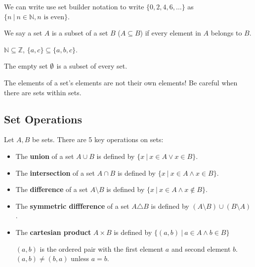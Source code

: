 \begin{notation}
	We can write use set builder notation to write \( \{0, 2, 4, 6, \ldots \}   \) as \( \{n ~|~ n \in \mathbb{N}, n \text{ is even}\} \).
\end{notation}

\begin{definition}
	We say a set \( A \) is a subset of a set \( B \) (\( A \subseteq B\)) if every element in \( A \) belongs to \( B \).
\end{definition}

\begin{eg}
	\( \mathbb{N} \subseteq \mathbb{Z} \), \( \{a, c\} \subseteq \{a, b, c\}    \).
\end{eg}

\begin{property}
	The empty set \( \emptyset \) is a subset of every set.
\end{property}

\begin{note}
	The elements of a set's elements are not their own elements! Be careful when there are sets within sets.
\end{note}

\subsection{Set Operations}
Let \( A,B \) be sets. There are 5 key operations on sets:
\begin{itemize}
	\item The \textbf{union} of a set \( A \cup B \) is defined by \( \{x ~|~ x \in A \lor x \in B\}   \).
	\item The \textbf{intersection} of a set \( A \cap B \) is defined by \( \{x ~|~ x \in A \land x \in B \}   \).
	\item The \textbf{difference} of a set \( A \setminus B \) is defined by \( \{x ~|~ x \in A \land x \not\in B \}   \).
	\item The \textbf{symmetric diffference} of a set \( A \triangle B \) is defined by \( (A \setminus B) \cup (B \setminus A) \).
	\item The \textbf{cartesian product} \( A \times B \) is defined by \( \{(a,b) ~|~ a \in A \land b \in B\}  \)
		\begin{note}
			\( (a,b) \) is the ordered pair with the first element \( a \) and second element \( b \). \( (a,b) \neq  (b,a) \) unless \( a = b \).
		\end{note}
\end{itemize}

